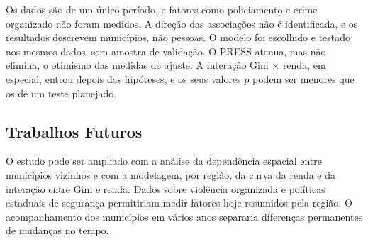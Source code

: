 \documentclass[a4paper,11pt]{article}
\begin{document}
Os dados são de um único período, e fatores como policiamento e crime organizado não foram medidos. A direção das associações não é identificada, e os resultados descrevem municípios, não pessoas. O modelo foi escolhido e testado nos mesmos dados, sem amostra de validação. O PRESS atenua, mas não elimina, o otimismo das medidas de ajuste. A interação Gini $\times$ renda, em especial, entrou depois das hipóteses, e os seus valores $p$ podem ser menores que os de um teste planejado.

\subsection{Trabalhos Futuros}

O estudo pode ser ampliado com a análise da dependência espacial entre municípios vizinhos e com a modelagem, por região, da curva da renda e da interação entre Gini e renda. Dados sobre violência organizada e políticas estaduais de segurança permitiriam medir fatores hoje resumidos pela região. O acompanhamento dos municípios em vários anos separaria diferenças permanentes de mudanças no tempo.




\end{document}
